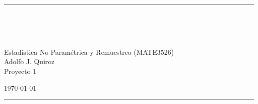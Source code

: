 \fancyhead[C]{}
\hrule \medskip
\begin{minipage}{0.295\textwidth} 
\raggedright
\footnotesize
\firstname \hfill\\ 
\firstid \hfill\\ 
\firstemail \hfill\\
\end{minipage}
\begin{minipage}{0.4\textwidth} 
\centering 
\large 
Estadística No Paramétrica y Remuestreo (MATE3526)\\
\normalsize
Adolfo J. Quiroz\\
Proyecto 1\\
\end{minipage}
\begin{minipage}{0.295\textwidth} 
\raggedleft
\today\hfill\\
\end{minipage}
\medskip\hrule 
\bigskip